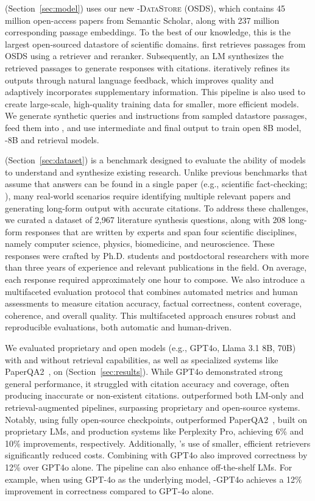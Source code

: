 \model (Section~\ref{sec:model}) uses our new \model-\textsc{DataStore} (OSDS), which contains 45 million open-access papers from Semantic Scholar, along with 237 million corresponding passage embeddings. 
To the best of our knowledge, this is the largest open-sourced datastore of scientific domains. 
\model first retrieves passages from OSDS using a retriever and reranker. Subsequently, an LM synthesizes the retrieved passages to generate responses with citations.
\model iteratively refines its outputs through natural language feedback, which improves quality and adaptively incorporates supplementary information. 
This pipeline is also used to create large-scale, high-quality training data for smaller, more efficient models. We generate synthetic queries and instructions from sampled datastore passages, feed them into \model, and use intermediate and final output to train open 8B model, \model-8B and retrieval models. 

\data (Section~\ref{sec:dataset}) is a benchmark designed to evaluate the ability of models to understand and synthesize existing research. Unlike previous benchmarks that assume that answers can be found in a single paper (e.g., scientific fact-checking; \citealp{wadden-etal-2020-fact,skarlinski2024language}), many real-world scenarios require identifying multiple relevant papers and generating long-form output with accurate citations. To address these challenges, we curated a dataset of 2,967 literature synthesis questions, along with 208 long-form responses that are written by experts and span four scientific disciplines, namely computer science, physics, biomedicine, and neuroscience. These responses were crafted by Ph.D. students and postdoctoral researchers with more than three years of experience and relevant publications in the field. On average, each response required approximately one hour to compose.  
We also introduce a multifaceted evaluation protocol that combines automated metrics and human assessments to measure citation accuracy, factual correctness, content coverage, coherence, and overall quality. 
This multifaceted approach ensures robust and reproducible evaluations, both automatic and human-driven. 

We evaluated proprietary and open models (e.g., GPT4o, Llama 3.1 8B, 70B) with and without retrieval capabilities, as well as specialized systems like PaperQA2~\citep{skarlinski2024language}, on \data (Section~\ref{sec:results}). While GPT4o demonstrated strong general performance, it struggled with citation accuracy and coverage, often producing inaccurate or non-existent citations.
\model outperformed both LM-only and retrieval-augmented pipelines, surpassing proprietary and open-source systems. Notably, using fully open-source checkpoints, \model outperformed PaperQA2~\citep{skarlinski2024language}, built on proprietary LMs, and production systems like Perplexity Pro, achieving 6\% and 10\% improvements, respectively. Additionally, \model's use of smaller, efficient retrievers significantly reduced costs.
Combining \model with GPT4o also improved correctness by 12\% over GPT4o alone.
The \model pipeline can also enhance off-the-shelf LMs. For example, when using GPT-4o as the underlying model, \model-GPT4o achieves a 12\% improvement in correctness compared to GPT-4o alone. 
 
